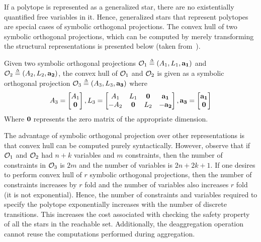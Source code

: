 If a polytope is represented as a generalized star, there are no existentially quantified free variables in it. Hence, generalized stars that represent polytopes are special cases of symbolic orthogonal projections. The convex hull of two symbolic orthogonal projections, which can be computed by merely transforming the structural representations is presented below (taken from~\cite{hagemann2014reachability}).

\begin{definition}
Given two symbolic orthogonal projections $\mathcal{O}_1 \mathrel{\stackrel{\scriptscriptstyle\Delta}{=}} (A_1, L_1, {\bf a_1})$ and $\mathcal{O}_2 \mathrel{\stackrel{\scriptscriptstyle\Delta}{=}} (A_2, L_2, {\bf a_2})$, the convex hull of $\mathcal{O}_1$ and $\mathcal{O}_2$ is given as a symbolic orthogonal projection $\mathcal{O}_3 \mathrel{\stackrel{\scriptscriptstyle\Delta}{=}} (A_3, L_3, {\bf a_3})$ where 
$$
A_3 = 
\begin{bmatrix} 
A_1 \\ 
{\bf 0} 
\end{bmatrix}, 
L_3 = 
\begin{bmatrix} 
A_1 & L_1 & {\bf 0} & {\bf a_1} \\
-A_2 & {\bf 0} & L_2 & -{\bf a_2}
\end{bmatrix},
{\bf a_3} =
\begin{bmatrix}
{\bf a_1} \\
{\bf 0}
\end{bmatrix}
$$
Where ${\bf 0}$ represents the zero matrix of the appropriate dimension. 
\end{definition}

The advantage of symbolic orthogonal projection over other representations is that convex hull can be computed purely syntactically. 
%
However, observe that if $\mathcal{O}_1$ and $\mathcal{O}_2$ had $n+k$ variables and $m$ constraints, then the number of constraints in $\mathcal{O}_3$ is $2m$ and the number of variables is $2n+2k+1$. 
%
If one desires to perform convex hull of $r$ symbolic orthogonal projections, then the number of constraints increases by $r$ fold and the number of variables also increases  $r$ fold (it is not exponential). 
%
Hence, the number of constraints and variables required to specify the polytope exponentially increases with the number of discrete transitions. This increases the cost associated with checking the safety property of all the stars in the reachable set. Additionally, the deaggregation operation cannot reuse the computations performed during aggregation.


